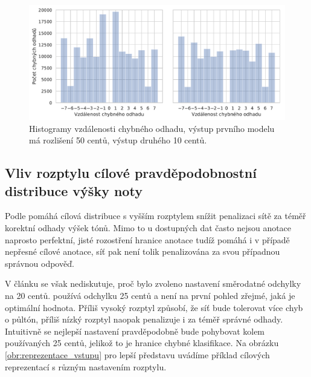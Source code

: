 \begin{figure}[h]\centering
    \includegraphics[scale=0.6]{../img/figures/crepe_diskretizace_hist.pdf}
\caption{Histogramy vzdálenosti chybného odhadu, výstup prvního modelu má rozlišení 50 centů, výstup druhého 10 centů.}\label{obr:crepe_diskretizace}
\end{figure}

\subsection{Vliv rozptylu cílové pravděpodobnostní distribuce výšky noty}

Podle \cite{Bittner2017} pomáhá cílová distribuce s vyšším rozptylem snížit penalizaci sítě za téměř korektní odhady výšek tónů. Mimo to u dostupných dat často nejsou anotace naprosto perfektní, jisté rozostření hranice anotace tudíž pomáhá i v případě nepřesné cílové anotace, síť pak není tolik penalizována za svou případnou správnou odpověď. 

V článku se však nediskutuje, proč bylo zvoleno nastavení směrodatné odchylky na 20 centů. \cite{Kim2018} používá odchylku 25 centů a není na první pohled zřejmé, jaká je optimální hodnota. Příliš vysoký rozptyl způsobí, že síť bude tolerovat více chyb o půltón, příliš nízký rozptyl naopak penalizuje i za téměř správné odhady. Intuitivně se nejlepší nastavení pravděpodobně bude pohybovat kolem používaných 25 centů, jelikož to je hranice chybné klasifikace. Na obrázku \ref{obr:reprezentace_vstupu} pro lepší představu uvádíme příklad cílových reprezentací s různým nastavením rozptylu.


